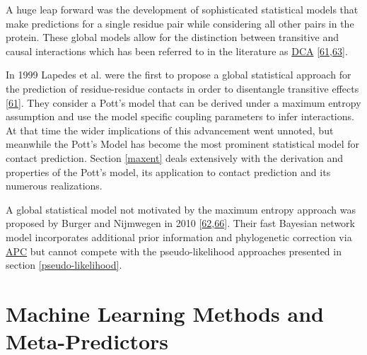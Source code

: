 \documentclass[11pt,a4paper,twoside]{book}
\theoremstyle{definition}
\theoremstyle{definition}
\theoremstyle{remark}
\begin{document}
A huge leap forward was the development of sophisticated statistical
models that make predictions for a single residue pair while considering
all other pairs in the protein. These global models allow for the
distinction between transitive and causal interactions which has been
referred to in the literature as \protect\hyperlink{abbrev}{DCA}
{[}\protect\hyperlink{ref-Lapedes1999}{61},\protect\hyperlink{ref-Weigt2009}{63}{]}.

In 1999 Lapedes et al. were the first to propose a global statistical
approach for the prediction of residue-residue contacts in order to
disentangle transitive effects
{[}\protect\hyperlink{ref-Lapedes1999}{61}{]}. They consider a Pott's
model that can be derived under a maximum entropy assumption and use the
model specific coupling parameters to infer interactions. At that time
the wider implications of this advancement went unnoted, but meanwhile
the Pott's Model has become the most prominent statistical model for
contact prediction. Section \ref{maxent} deals extensively with the
derivation and properties of the Pott's model, its application to
contact prediction and its numerous realizations.

A global statistical model not motivated by the maximum entropy approach
was proposed by Burger and Nijmwegen in 2010
{[}\protect\hyperlink{ref-Burger2010}{62},\protect\hyperlink{ref-Burger2008}{66}{]}.
Their fast Bayesian network model incorporates additional prior
information and phylogenetic correction via
\protect\hyperlink{abbrev}{APC} but cannot compete with the
pseudo-likelihood approaches presented in section
\ref{pseudo-likelihood}.

\section{Machine Learning Methods and
Meta-Predictors}\label{meta-predictors}
\end{document}

